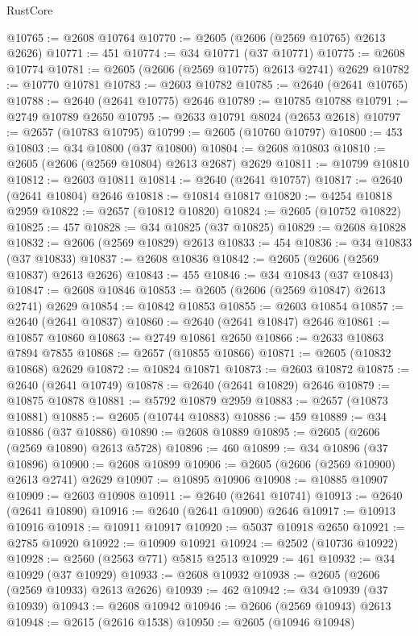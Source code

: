 \begin{lexlean}{RustCore}
\begin{coremodule}
@10765 := @2608 @10764
@10770 := @2605 (@2606 (@2569 @10765) @2613 @2626)
@10771 := 451
@10774 := @34 @10771 (@37 @10771)
@10775 := @2608 @10774
@10781 := @2605 (@2606 (@2569 @10775) @2613 @2741) @2629
@10782 := @10770 @10781
@10783 := @2603 @10782
@10785 := @2640 (@2641 @10765)
@10788 := @2640 (@2641 @10775) @2646
@10789 := @10785 @10788
@10791 := @2749 @10789 @2650
@10795 := @2633 @10791 @8024 (@2653 @2618)
@10797 := @2657 (@10783 @10795)
@10799 := @2605 (@10760 @10797)
@10800 := 453
@10803 := @34 @10800 (@37 @10800)
@10804 := @2608 @10803
@10810 := @2605 (@2606 (@2569 @10804) @2613 @2687) @2629
@10811 := @10799 @10810
@10812 := @2603 @10811
@10814 := @2640 (@2641 @10757)
@10817 := @2640 (@2641 @10804) @2646
@10818 := @10814 @10817
@10820 := @4254 @10818 @2959
@10822 := @2657 (@10812 @10820)
@10824 := @2605 (@10752 @10822)
@10825 := 457
@10828 := @34 @10825 (@37 @10825)
@10829 := @2608 @10828
@10832 := @2606 (@2569 @10829) @2613
@10833 := 454
@10836 := @34 @10833 (@37 @10833)
@10837 := @2608 @10836
@10842 := @2605 (@2606 (@2569 @10837) @2613 @2626)
@10843 := 455
@10846 := @34 @10843 (@37 @10843)
@10847 := @2608 @10846
@10853 := @2605 (@2606 (@2569 @10847) @2613 @2741) @2629
@10854 := @10842 @10853
@10855 := @2603 @10854
@10857 := @2640 (@2641 @10837)
@10860 := @2640 (@2641 @10847) @2646
@10861 := @10857 @10860
@10863 := @2749 @10861 @2650
@10866 := @2633 @10863 @7894 @7855
@10868 := @2657 (@10855 @10866)
@10871 := @2605 (@10832 @10868) @2629
@10872 := @10824 @10871
@10873 := @2603 @10872
@10875 := @2640 (@2641 @10749)
@10878 := @2640 (@2641 @10829) @2646
@10879 := @10875 @10878
@10881 := @5792 @10879 @2959
@10883 := @2657 (@10873 @10881)
@10885 := @2605 (@10744 @10883)
@10886 := 459
@10889 := @34 @10886 (@37 @10886)
@10890 := @2608 @10889
@10895 := @2605 (@2606 (@2569 @10890) @2613 @5728)
@10896 := 460
@10899 := @34 @10896 (@37 @10896)
@10900 := @2608 @10899
@10906 := @2605 (@2606 (@2569 @10900) @2613 @2741) @2629
@10907 := @10895 @10906
@10908 := @10885 @10907
@10909 := @2603 @10908
@10911 := @2640 (@2641 @10741)
@10913 := @2640 (@2641 @10890)
@10916 := @2640 (@2641 @10900) @2646
@10917 := @10913 @10916
@10918 := @10911 @10917
@10920 := @5037 @10918 @2650
@10921 := @2785 @10920
@10922 := @10909 @10921
@10924 := @2502 (@10736 @10922)
@10928 := @2560 (@2563 @771) @5815 @2513
@10929 := 461
@10932 := @34 @10929 (@37 @10929)
@10933 := @2608 @10932
@10938 := @2605 (@2606 (@2569 @10933) @2613 @2626)
@10939 := 462
@10942 := @34 @10939 (@37 @10939)
@10943 := @2608 @10942
@10946 := @2606 (@2569 @10943) @2613
@10948 := @2615 (@2616 @1538)
@10950 := @2605 (@10946 @10948)

\end{coremodule}
\end{lexlean}
